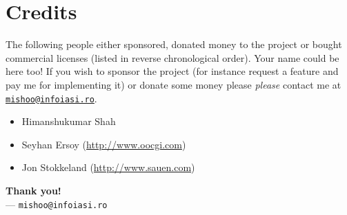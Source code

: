 \documentclass[a4paper,10pt]{article}
\begin{document}
\section{Credits}

The following people either sponsored, donated money to the project or bought
commercial licenses (listed in reverse chronological order).  Your name could
be here too!  If you wish to sponsor the project (for instance request a
feature and pay me for implementing it) or donate some money please
\emph{please} contact me at \texttt{\href{mailto:mishoo@infoiasi.ro}{mishoo@infoiasi.ro}}.

\begin{itemize}

\item Himanshukumar Shah

\item Seyhan Ersoy ({\href{http://www.oocgi.com}{http://www.oocgi.com}})

\item Jon Stokkeland ({\href{http://www.sauen.com}{http://www.sauen.com}})

\end{itemize}

\begin{flushright}
\textbf{Thank you!}\\
--- \texttt{mishoo@infoiasi.ro}
\end{flushright}
\end{document}
